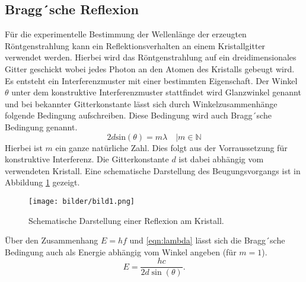 \subsection{Bragg´sche Reflexion}
Für die experimentelle Bestimmung der Wellenlänge der erzeugten Röntgenstrahlung kann ein Reflektionsverhalten an einem Kristallgitter verwendet werden.
Hierbei wird das Röntgenstrahlung auf ein dreidimensionales Gitter geschickt wobei jedes Photon an den Atomen des Kristalls gebeugt wird. Es entsteht ein Interferenzmuster mit einer bestimmten Eigenschaft.
Der Winkel $\theta$ unter dem konstruktive Interferenzmuster stattfindet wird Glanzwinkel genannt und bei bekannter Gitterkonstante lässt sich durch Winkelzusammenhänge folgende Bedingung aufschreiben.
Diese Bedingung wird auch Bragg´sche Bedingung genannt.
\begin{equation}
\label{eqn:lambda}
2 d \text{sin}(\theta) =  m \lambda \quad | m \in \mathbb{N}
\end{equation}
Hierbei ist $m$ ein ganze natürliche Zahl. Dies folgt aus der Vorraussetzung für konstruktive Interferenz. Die Gitterkonstante $d$ ist dabei abhängig vom verwendeten Kristall.
Eine schematische Darstellung des Beugungsvorgangs ist in Abbildung \ref{fig:bild1} gezeigt.
\\
\begin{figure}[h]
  \centering
  \texttt{[image: bilder/bild1.png]}
  \caption{Schematische Darstellung einer Reflexion am Kristall.}
  \label{fig:bild1}
\end{figure}
Über den Zusammenhang $E = h f$  und \ref{eqn:lambda} lässt sich die Bragg´sche Bedingung auch als Energie abhängig vom Winkel angeben (für $m=1$).
\begin{equation}
    \label{eqn:braggEnergy}
    E = \frac{h c}{2 d \sin (\theta )}.
\end{equation}
